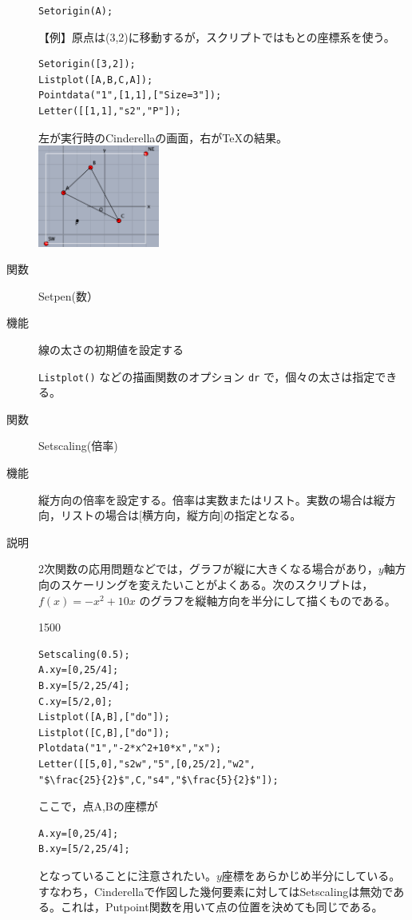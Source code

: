 \documentclass[papersize,a4paper,12pt,uplatex]{jsarticle}
\begin{document}
\begin{description}
\hspace{10mm}\verb|Setorigin(A);|

\vspace{\baselineskip}
【例】原点は(3,2)に移動するが，スクリプトではもとの座標系を使う。
\begin{verbatim}
Setorigin([3,2]);
Listplot([A,B,C,A]);
Pointdata("1",[1,1],["Size=3"]);
Letter([[1,1],"s2","P"]);
\end{verbatim}
左が実行時のCinderellaの画面，右が\TeX の結果。\\

\hspace{10mm} \includegraphics[bb=0 0 299.02 250.01, width=4cm]{Fig/setorigin.pdf} 
\hspace{5mm} 

\vspace{\baselineskip}
\hypertarget{setpen}{}
\item[関数]Setpen(数）
\item[機能]線の太さの初期値を設定する

\verb|Listplot()| などの描画関数のオプション \verb|dr| で，個々の太さは指定できる。

\vspace{\baselineskip}
\hypertarget{setscaling}{}
\item[関数]Setscaling(倍率)
\item[機能]縦方向の倍率を設定する。倍率は実数またはリスト。実数の場合は縦方向，リストの場合は[横方向，縦方向]の指定となる。
\item[説明]2次関数の応用問題などでは，グラフが縦に大きくなる場合があり，$y$軸方向のスケーリングを変えたいことがよくある。次のスクリプトは，$f(x)=-x^2+10x$ のグラフを縦軸方向を半分にして描くものである。

\begin{layer}{150}{0}
\end{layer}
\begin{verbatim}
Setscaling(0.5);
A.xy=[0,25/4];
B.xy=[5/2,25/4];
C.xy=[5/2,0];
Listplot([A,B],["do"]);
Listplot([C,B],["do"]);
Plotdata("1","-2*x^2+10*x","x");
Letter([[5,0],"s2w","5",[0,25/2],"w2",
"$\frac{25}{2}$",C,"s4","$\frac{5}{2}$"]);
\end{verbatim}
ここで，点A,Bの座標が
\begin{verbatim}
A.xy=[0,25/4];
B.xy=[5/2,25/4];
\end{verbatim}
となっていることに注意されたい。$y$座標をあらかじめ半分にしている。すなわち，Cinderellaで作図した幾何要素に対してはSetscalingは無効である。これは，Putpoint関数を用いて点の位置を決めても同じである。


\end{description}
\end{document}
